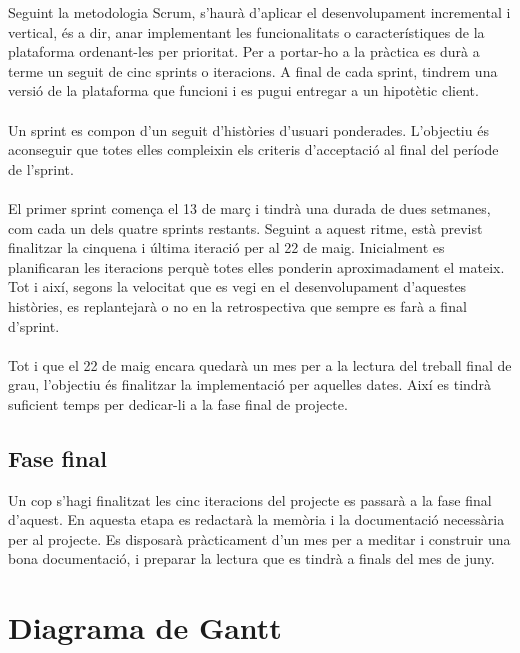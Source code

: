 Seguint la metodologia Scrum, s'haurà d'aplicar el desenvolupament incremental i vertical, és a dir, anar implementant les funcionalitats o característiques de la plataforma ordenant-les per prioritat. Per a portar-ho a la pràctica es durà a terme un seguit de cinc sprints o iteracions. A final de cada sprint, tindrem una versió de la plataforma que funcioni i es pugui entregar a un hipotètic client.
\\\\
Un sprint es compon d'un seguit d'històries d'usuari ponderades. L'objectiu és aconseguir que totes elles compleixin els criteris d'acceptació al final del període de l'sprint.
\\\\
El primer sprint comença el 13 de març i tindrà una durada de dues setmanes, com cada un dels quatre sprints restants. Seguint a aquest ritme, està previst finalitzar la cinquena i última iteració per al 22 de maig. Inicialment es planificaran les iteracions perquè totes elles ponderin aproximadament el mateix. Tot i així, segons la velocitat que es vegi en el desenvolupament d'aquestes històries, es replantejarà o no en la retrospectiva que sempre es farà a final d'sprint.
\\\\
Tot i que el 22 de maig encara quedarà un mes per a la lectura del treball final de grau, l'objectiu és finalitzar la implementació per aquelles dates. Així es tindrà suficient temps per dedicar-li a la fase final de projecte.

\subsection{Fase final}

Un cop s'hagi finalitzat les cinc iteracions del projecte es passarà a la fase final d'aquest. En aquesta etapa es redactarà la memòria i la documentació necessària per al projecte. Es disposarà pràcticament d'un mes per a meditar i construir una bona documentació, i preparar la lectura que es tindrà a finals del mes de juny.


\section{Diagrama de Gantt}

